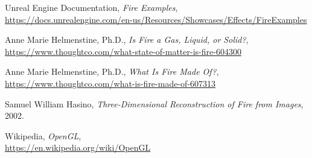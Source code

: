 \begin{thebibliography}{x}
 Unreal Engine Documentation, 
 \textit{Fire Examples},\\
 \url{https://docs.unrealengine.com/en-us/Resources/Showcases/Effects/FireExamples}

 Anne Marie Helmenstine, Ph.D., 
 \textit{Is Fire a Gas, Liquid, or Solid?},\\
 \url{https://www.thoughtco.com/what-state-of-matter-is-fire-604300}

 Anne Marie Helmenstine, Ph.D., 
 \textit{What Is Fire Made Of?},\\
 \url{https://www.thoughtco.com/what-is-fire-made-of-607313}

  Samuel William Hasino,
  \textit{Three-Dimensional Reconstruction of Fire from Images},
 2002.

 Wikipedia, 
 \textit{OpenGL},\\
 \url{https://en.wikipedia.org/wiki/OpenGL}

\end{thebibliography}

